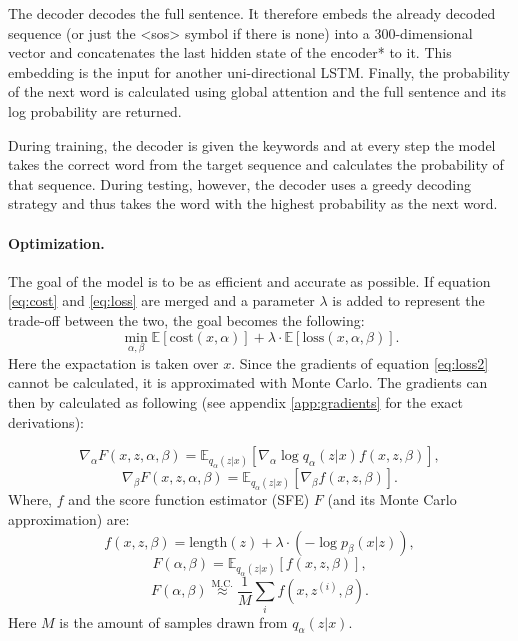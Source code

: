 \documentclass[a4paper, 12pt]{report}
\newcommand{\approxtext}[1]{\ensuremath{\stackrel{\text{#1}}{\approx}}}
\begin{document}
The decoder decodes the full sentence. 
It therefore embeds the already decoded sequence (or just the <sos> symbol if there is none) into a 300-dimensional vector and concatenates the last hidden state of the encoder* to it. 
This embedding is the input for another uni-directional LSTM. 
Finally, the probability of the next word is calculated using global attention and the full sentence and its log probability are returned. 

During training, the decoder is given the keywords and at every step the model takes the correct word from the target sequence and calculates the probability of that sequence.
During testing, however, the decoder uses a greedy decoding strategy and thus takes the word with the highest probability as the next word. 

\paragraph{Optimization.} 
The goal of the model is to be as efficient and accurate as possible. 
If equation \ref{eq:cost} and \ref{eq:loss} are merged and a parameter $\lambda$ is added to represent the trade-off between the two, the goal becomes the following:
\begin{equation}
    \label{eq:loss2}
    \min_{\alpha, \beta} \mathbb{E} [\text{cost}(x, \alpha)] + \lambda \cdot \mathbb{E}[\text{loss}(x, \alpha, \beta)].
\end{equation}
Here the expactation is taken over $x$. 
Since the gradients of equation \ref{eq:loss2} cannot be calculated, it is approximated with Monte Carlo.
The gradients can then by calculated as following (see appendix \ref{app:gradients} for the exact derivations):

\begin{equation}
    \label{eq:gradient_alpha}
    \nabla_\alpha F(x, z, \alpha, \beta) = \mathbb{E}_{q_{\alpha}(z|x)} [\nabla_{\alpha} \log q_{\alpha}(z|x) f(x, z, \beta)],
\end{equation}
\begin{equation}
    \label{eq:gradient_beta}
    \nabla_\beta F(x, z, \alpha, \beta) = \mathbb{E}_{q_{\alpha}(z|x)} [\nabla_{\beta} f (x, z, \beta)].
\end{equation}
Where, $f$ and the score function estimator (SFE) $F$ (and its Monte Carlo approximation) are:
\begin{equation}
    \label{eq:f}
    f(x, z, \beta) = \text{length}(z) + \lambda \cdot (-\log p_{\beta}(x|z)),
\end{equation}
\begin{equation}
    \label{eq:F}
    F (\alpha, \beta) = \mathbb{E}_{q_{\alpha}(z|x)} [f(x, z, \beta)],
\end{equation}
\begin{equation}
    \label{eq:F_approx}
    F (\alpha, \beta) \approxtext{M.C.} \frac{1}{M} \sum_i f (x, z^{(i)}, \beta).
\end{equation}
Here $M$ is the amount of samples drawn from $q_{\alpha}(z|x)$.
\end{document}
